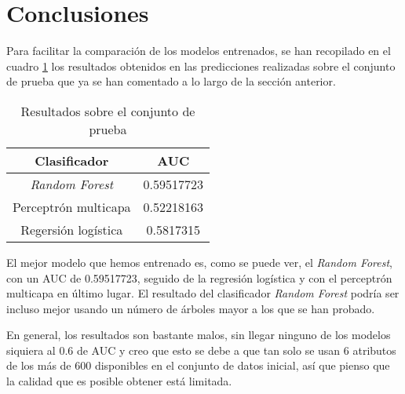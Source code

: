 \section{Conclusiones}

Para facilitar la comparación de los modelos entrenados, se han recopilado en el
cuadro \ref{tab:test} los resultados obtenidos en las predicciones realizadas
sobre el conjunto de prueba que ya se han comentado a lo largo de la sección
anterior.

\begin{table}[h!]
    \caption{Resultados sobre el conjunto de prueba}
    \label{tab:test}
    \begin{center}
        \begin{tabular}{ |c|c| }
            \hline
            \textbf{Clasificador}  & \textbf{AUC} \\
            \hline
            \textit{Random Forest} & 0.59517723   \\
            \hline
            Perceptrón multicapa   & 0.52218163   \\
            \hline
            Regersión logística    & 0.5817315    \\
            \hline
        \end{tabular}
    \end{center}
\end{table}

El mejor modelo que hemos entrenado es, como se puede ver, el \textit{Random
    Forest}, con un AUC de 0.59517723, seguido de la regresión logística y con el
perceptrón multicapa en último lugar. El resultado del clasificador
\textit{Random Forest} podría ser incluso mejor usando un número de árboles
mayor a los que se han probado.

En general, los resultados son bastante malos, sin llegar ninguno de los modelos
siquiera al 0.6 de AUC y creo que esto se debe a que tan solo se usan 6
atributos de los más de 600 disponibles en el conjunto de datos inicial, así que
pienso que la calidad que es posible obtener está limitada.

